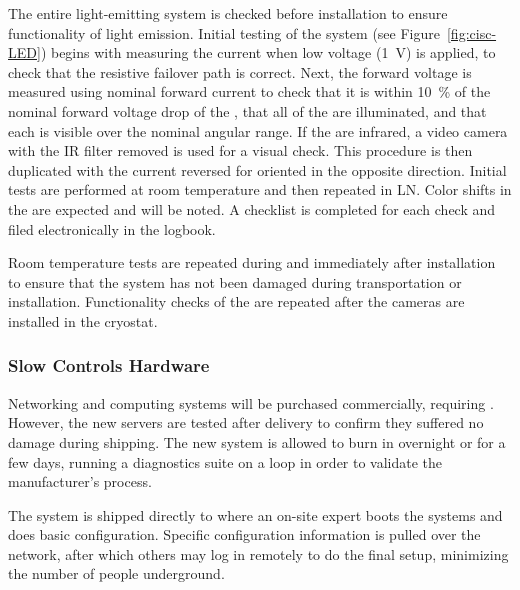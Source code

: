 The entire light-emitting system is checked before installation to ensure functionality of light emission. 
Initial testing of the system (see Figure~\ref{fig:cisc-LED}) begins with
measuring the current when low voltage (\SI{1}{V}) is applied, to check
that the resistive  failover path is correct. Next, the forward voltage is measured using nominal forward current to
check that it is within \SI{10}{\%} of the nominal forward voltage drop of
the , that all of the  are illuminated, and that each  is visible over the nominal angular range. If the  are
infrared, a video camera with the IR filter removed is used for a
visual check. This procedure is then duplicated with the current
reversed for  oriented in the opposite direction. Initial tests are performed at room temperature and then repeated in LN. Color shifts in the  are expected and will be noted. A checklist is completed for each  check and filed electronically in the  logbook.

Room temperature tests are repeated during and immediately after installation to ensure that the system has not been damaged during transportation or installation. Functionality checks of the  are repeated after the cameras are installed in the cryostat.

\subsubsection{Slow Controls Hardware}
\label{sec:fdsp-slow-cryo-qc-sc-hard}

Networking and computing systems will be purchased commercially, requiring . However, the new servers %
are tested after delivery to confirm they suffered no damage during shipping. The new system is allowed to burn in overnight or for a few days, 
running a diagnostics suite on a loop in order to validate %
the manufacturer's  process.

The system %
is shipped directly to \surf
where an on-site
expert %
boots the systems and does basic
configuration. %
Specific configuration information %
is pulled over
the network, after which others may log in remotely to do the final
setup, minimizing the number of people underground.


